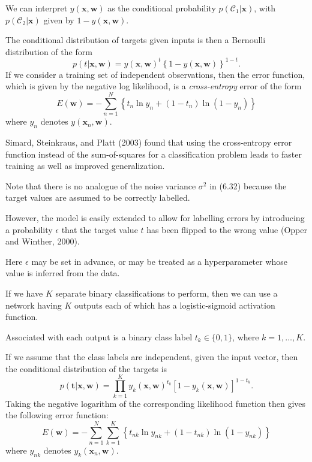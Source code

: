 \documentclass{article}
\begin{document}
We can interpret $y(\mathbf{x}, \mathbf{w})$ as the conditional probability $p(\mathcal{C}_1|\mathbf{x})$, with $p(\mathcal{C}_2|\mathbf{x})$ given by $1 - y(\mathbf{x}, \mathbf{w})$. 

The conditional distribution of targets given inputs is then a Bernoulli distribution of the form
\begin{equation}
p(t|\mathbf{x}, \mathbf{w}) = y(\mathbf{x}, \mathbf{w})^t \left\{1 - y(\mathbf{x}, \mathbf{w})\right\}^{1-t}.
\tag{6.32}
\end{equation}
If we consider a training set of independent observations, then the error function, which is given by the negative log likelihood, is a \emph{cross-entropy} error of the form
\begin{equation}
E(\mathbf{w}) = -\sum_{n=1}^N \left\{ t_n \ln y_n + (1 - t_n) \ln (1 - y_n) \right\}
\tag{6.33}
\end{equation}
where $y_n$ denotes $y(\mathbf{x}_n, \mathbf{w})$. 

Simard, Steinkraus, and Platt (2003) found that using the cross-entropy error function instead of the sum-of-squares for a classification problem leads to faster training as well as improved generalization.

Note that there is no analogue of the noise variance $\sigma^2$ in (6.32) because the target values are assumed to be correctly labelled. 

However, the model is easily extended to allow for labelling errors by introducing a probability $\epsilon$ that the target value $t$ has been flipped to the wrong value (Opper and Winther, 2000). 

Here $\epsilon$ may be set in advance, or may be treated as a hyperparameter whose value is inferred from the data.

If we have $K$ separate binary classifications to perform, then we can use a network having $K$ outputs each of which has a logistic-sigmoid activation function. 

Associated with each output is a binary class label $t_k \in \{0,1\}$, where $k = 1,\ldots,K$. 

If we assume that the class labels are independent, given the input vector, then the conditional distribution of the targets is
\begin{equation}
p(\mathbf{t}|\mathbf{x}, \mathbf{w}) = \prod_{k=1}^K y_k(\mathbf{x}, \mathbf{w})^{t_k} \left[1 - y_k(\mathbf{x}, \mathbf{w})\right]^{1 - t_k}.
\tag{6.34}
\end{equation}
Taking the negative logarithm of the corresponding likelihood function then gives the following error function:
\begin{equation}
E(\mathbf{w}) = -\sum_{n=1}^N \sum_{k=1}^K \left\{ t_{nk} \ln y_{nk} + (1 - t_{nk}) \ln (1 - y_{nk}) \right\}
\tag{6.35}
\end{equation}
where $y_{nk}$ denotes $y_k(\mathbf{x}_n, \mathbf{w})$. 
\end{document}
